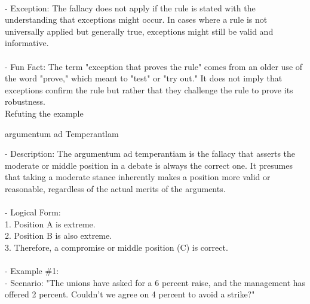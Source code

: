\documentclass[a4paper,12pt,single,pdftex]{scrartcl}
\begin{document}
    
      
    \\

    
      - Exception: The fallacy does not apply if the rule is stated with the understanding that exceptions might occur. In cases where a rule is not universally applied but generally true, exceptions might still be valid and informative.
    \\

    
      
    \\

    
      - Fun Fact: The term "exception that proves the rule" comes from an older use of the word "prove," which meant to "test" or "try out." It does not imply that exceptions confirm the rule but rather that they challenge the rule to prove its robustness.
    \\

  

Refuting the example

argumentum ad Temperantlam
    
      - Description: The argumentum ad temperantiam is the fallacy that asserts the moderate or middle position in a debate is always the correct one. It presumes that taking a moderate stance inherently makes a position more valid or reasonable, regardless of the actual merits of the arguments.
    \\

    
      
    \\

    
      - Logical Form: 
    \\

    
        1. Position A is extreme.
    \\

    
        2. Position B is also extreme.
    \\

    
        3. Therefore, a compromise or middle position (C) is correct.
    \\

    
      
    \\

    
      - Example \#1:
    \\

    
        - Scenario: "The unions have asked for a 6 percent raise, and the management has offered 2 percent. Couldn’t we agree on 4 percent to avoid a strike?"
    \\
\end{document}
